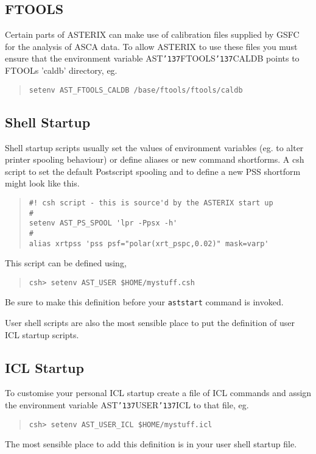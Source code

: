 \documentclass{book}
\renewcommand{\_}{{\tt\char'137}}     %
\begin{document}
\subsection{FTOOLS}
Certain parts of ASTERIX can make use of calibration files supplied
by GSFC for the analysis of ASCA data. To allow ASTERIX to use these
files you must ensure that the environment variable AST\_FTOOLS\_CALDB
points to FTOOLs 'caldb' directory, eg.
\begin{quote}\begin{verbatim}
setenv AST_FTOOLS_CALDB /base/ftools/ftools/caldb
\end{verbatim}\end{quote}
\subsection{Shell Startup}
Shell startup scripts usually set the values of environment
variables (eg. to alter printer spooling behaviour) or define
aliases or new command shortforms. A csh script to set the default
Postscript spooling and to define a new PSS shortform might look
like this.

\begin{quote}\begin{verbatim}
#! csh script - this is source'd by the ASTERIX start up
#
setenv AST_PS_SPOOL 'lpr -Ppsx -h'
#
alias xrtpss 'pss psf="polar(xrt_pspc,0.02)" mask=varp'
\end{verbatim}\end{quote}
This script can be defined using,

\begin{quote}\begin{verbatim}
csh> setenv AST_USER $HOME/mystuff.csh
\end{verbatim}\end{quote}
Be sure to make this definition before your {\tt aststart} command
is invoked.

User shell scripts are also the most sensible place to put the
definition of user ICL startup scripts.

\subsection{ICL Startup}
To customise your personal ICL startup create a file of ICL commands
and assign the environment variable AST\_USER\_ICL to that file, eg.
\begin{quote}\begin{verbatim}
csh> setenv AST_USER_ICL $HOME/mystuff.icl
\end{verbatim}\end{quote}
The most sensible place to add this definition is in your user shell
startup file.
\end{document}
